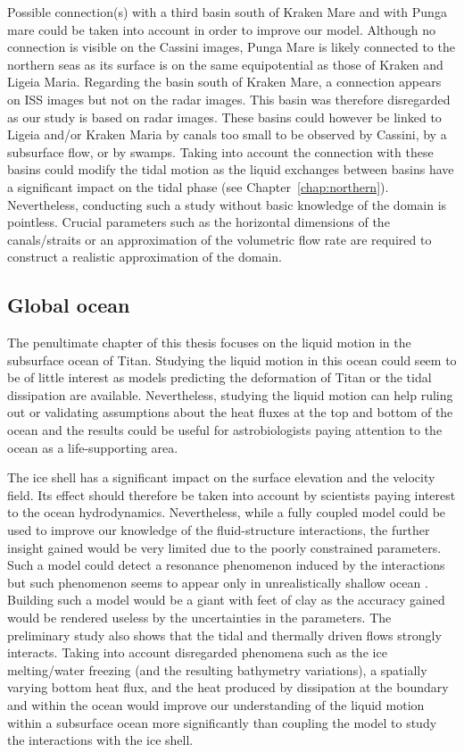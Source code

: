 Possible connection(s) with a third basin south of Kraken Mare and with Punga mare could be taken into account in order to improve our model. Although no connection is visible on the Cassini images, Punga Mare is likely connected to the northern seas as its surface is on the same equipotential as those of Kraken and Ligeia Maria. Regarding the basin south of Kraken Mare, a connection appears on ISS images but not on the radar images. This basin was therefore disregarded as our study is based on radar images. These basins could however be linked to Ligeia and/or Kraken Maria by canals too small to be observed by Cassini, by a subsurface flow, or by swamps. Taking into account the connection with these basins could modify the tidal motion as the liquid exchanges between basins have a significant impact on the tidal phase (see Chapter~\ref{chap:northern}). Nevertheless, conducting such a study without basic knowledge of the domain is pointless. Crucial parameters such as the horizontal dimensions of the canals/straits or an approximation of the volumetric flow rate are required to construct a realistic approximation of the domain.

\subsection*{Global ocean}
The penultimate chapter of this thesis focuses on the liquid motion in the subsurface ocean of Titan. Studying the liquid motion in this ocean could seem to be of little interest as models predicting the deformation of Titan or the tidal dissipation are available. Nevertheless, studying the liquid motion can help ruling out or validating assumptions about the heat fluxes at the top and bottom of the ocean and the results could be useful for astrobiologists paying attention to the ocean as a life-supporting area.

The ice shell has a significant impact on the surface elevation and the velocity field. Its effect should therefore be taken into account by scientists paying interest to the ocean hydrodynamics. Nevertheless, while a fully coupled model could be used to improve our knowledge of the fluid-structure interactions, the further insight gained would be very limited due to the poorly constrained parameters. Such a model could detect a resonance phenomenon induced by the interactions but such phenomenon seems to appear only in unrealistically shallow ocean \citep[see, e.g.,][]{hay2017numerically,tyler2014comparative}. Building such a model would be a giant with feet of clay as the accuracy gained would be rendered useless by the uncertainties in the parameters. The preliminary study also shows that the tidal and thermally driven flows strongly interacts. Taking into account disregarded phenomena such as the ice melting/water freezing (and the resulting bathymetry variations), a spatially varying bottom heat flux, and the heat produced by dissipation at the boundary and within the ocean would improve our understanding of the liquid motion within a subsurface ocean more significantly than coupling the model to study the interactions with the ice shell.

